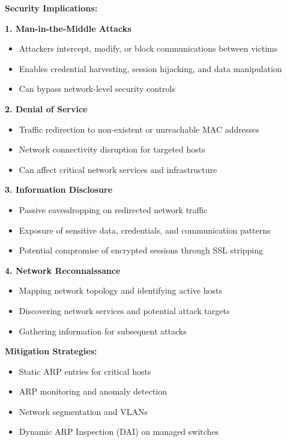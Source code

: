 \documentclass[12pt,a4paper]{article}
\begin{document}
\textbf{Security Implications:}

\textbf{1. Man-in-the-Middle Attacks}
\begin{itemize}
    \item Attackers intercept, modify, or block communications between victims
    \item Enables credential harvesting, session hijacking, and data manipulation
    \item Can bypass network-level security controls
\end{itemize}

\textbf{2. Denial of Service}
\begin{itemize}
    \item Traffic redirection to non-existent or unreachable MAC addresses
    \item Network connectivity disruption for targeted hosts
    \item Can affect critical network services and infrastructure
\end{itemize}

\textbf{3. Information Disclosure}
\begin{itemize}
    \item Passive eavesdropping on redirected network traffic
    \item Exposure of sensitive data, credentials, and communication patterns
    \item Potential compromise of encrypted sessions through SSL stripping
\end{itemize}

\textbf{4. Network Reconnaissance}
\begin{itemize}
    \item Mapping network topology and identifying active hosts
    \item Discovering network services and potential attack targets
    \item Gathering information for subsequent attacks
\end{itemize}

\textbf{Mitigation Strategies:}
\begin{itemize}
    \item Static ARP entries for critical hosts
    \item ARP monitoring and anomaly detection
    \item Network segmentation and VLANs
    \item Dynamic ARP Inspection (DAI) on managed switches
\end{itemize}
\end{document}
